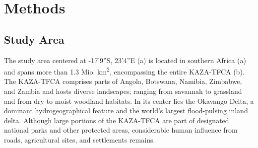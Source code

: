 \documentclass[abstract=on,10pt,a4paper,bibliography=totocnumbered]{article}
\begin{document}
\section{Methods}
\subsection{Study Area}
The study area centered at -17'9''S, 23'4''E
(a) is located in southern Africa (a) and spans
more than 1.3 Mio. km\textsuperscript{2}, encompassing the entire KAZA-TFCA
(b). The KAZA-TFCA comprises parts of Angola, Botswana, Namibia,
Zimbabwe, and Zambia and hosts diverse landscapes; ranging from savannah to
grassland and from dry to moist woodland habitats. In its center lies the
Okavango Delta, a dominant hydrogeographical feature and the world's largest
flood-pulsing inland delta. Although large portions of the KAZA-TFCA are part of
designated national parks and other protected areas, considerable human
influence from roads, agricultural sites, and settlements remains.
\end{document}
